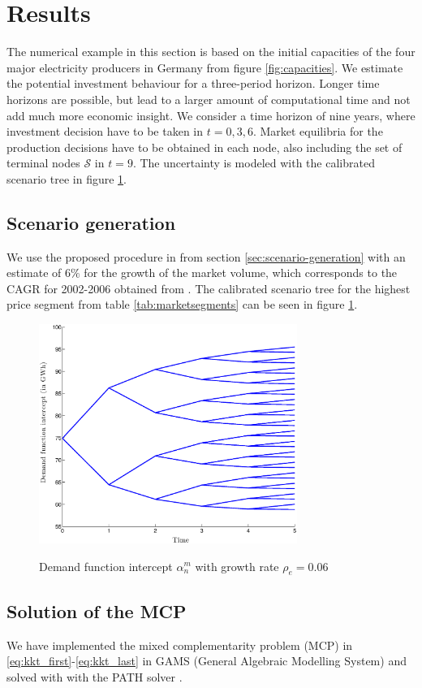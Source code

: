 \clearpage
\section{Results}
\label{sec:results}

The numerical example in this section is based on the initial capacities of the four major electricity producers in Germany from figure \ref{fig:capacities}. We estimate the potential investment behaviour for a three-period horizon. Longer time horizons are possible, but lead to a larger amount of computational time and not add much more economic insight. We consider a time horizon of nine years, where investment decision have to be taken in $t=0,3,6$. Market equilibria for the production decisions have to be obtained in each node, also including the set of terminal nodes $\mathcal{S}$ in $t=9$.  The uncertainty is modeled with the calibrated scenario tree in figure \ref{fig:intercept}.

\subsection{Scenario generation}

We use the proposed procedure in from section \ref{sec:scenario-generation} with an estimate of $6\%$ for the growth of the market volume, which corresponds to the CAGR for 2002-2006 obtained from \cite{Datamonitor2007}. The calibrated scenario tree for the highest price segment from table \ref{tab:marketsegments} can be seen in figure \ref{fig:intercept}.

\begin{figure}[htb]
  \centering
\caption{Demand function intercept $\alpha_n^m$ with growth rate $\rho_e=0.06$}
  \includegraphics[width=0.75\textwidth]{intercept}
  \label{fig:intercept}
\end{figure}


\subsection{Solution of the MCP}

We have implemented the mixed complementarity problem (MCP) in \eqref{eq:kkt_first}-\eqref{eq:kkt_last} in GAMS (General Algebraic Modelling System) and solved with with the PATH solver \citep[see][]{Ferris2000}.

